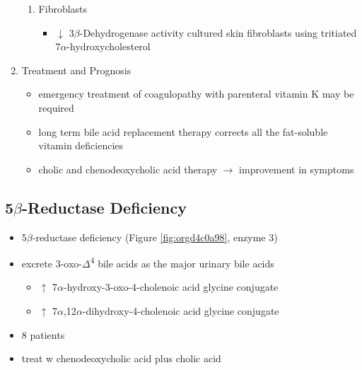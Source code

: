 \documentclass[12pt]{scrartcl}
\begin{document}
\begin{enumerate}
\begin{enumerate}
\item Fibroblasts
\label{sec:org4651357}
\begin{itemize}
\item \(\downarrow\) 3\(\beta\)-Dehydrogenase activity cultured skin fibroblasts using
tritiated 7\(\alpha\)-hydroxycholesterol
\end{itemize}
\end{enumerate}

\item Treatment and Prognosis
\label{sec:org40e1b4b}
\begin{itemize}
\item emergency treatment of coagulopathy with parenteral vitamin K may be required
\item long term bile acid replacement therapy corrects all the fat-soluble
vitamin deficiencies

\item cholic and chenodeoxycholic acid therapy \(\to\) improvement in symptoms
\end{itemize}
\end{enumerate}

\subsection{5\(\beta\)-Reductase Deficiency}
\label{sec:org10ee316}
\begin{itemize}
\item 5\(\beta\)-reductase deficiency (Figure \ref{fig:orgd4c0a98}, enzyme 3)
\item excrete 3-oxo-\(\Delta\)\textsuperscript{4} bile acids as the major urinary bile acids
\begin{itemize}
\item \(\uparrow\) 7\(\alpha\)-hydroxy-3-oxo-4-cholenoic acid glycine conjugate
\item \(\uparrow\) 7\(\alpha\),12\(\alpha\)-dihydroxy-4-cholenoic acid glycine conjugate
\end{itemize}
\item 8 patients
\item treat w chenodeoxycholic acid plus cholic acid
\end{itemize}
\end{document}
